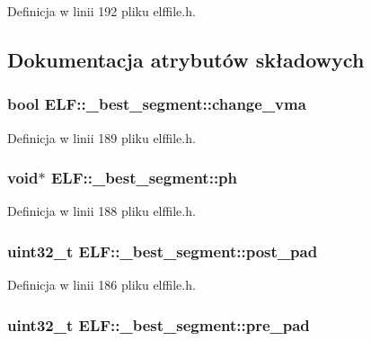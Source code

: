 Definicja w linii 192 pliku elffile.\-h.



\subsection{Dokumentacja atrybutów składowych}
\hypertarget{struct_e_l_f_1_1__best__segment_a47ba70e7bd8a26848b6751b2284d125d}{
\subsubsection[{change\-\_\-vma}]{\setlength{\rightskip}{0pt plus 5cm}bool E\-L\-F\-::\-\_\-best\-\_\-segment\-::change\-\_\-vma}}\label{struct_e_l_f_1_1__best__segment_a47ba70e7bd8a26848b6751b2284d125d}


Definicja w linii 189 pliku elffile.\-h.

\hypertarget{struct_e_l_f_1_1__best__segment_a3ff5e6f835d033c2e6c474f40effcaa5}{
\subsubsection[{ph}]{\setlength{\rightskip}{0pt plus 5cm}void$\ast$ E\-L\-F\-::\-\_\-best\-\_\-segment\-::ph}}\label{struct_e_l_f_1_1__best__segment_a3ff5e6f835d033c2e6c474f40effcaa5}


Definicja w linii 188 pliku elffile.\-h.

\hypertarget{struct_e_l_f_1_1__best__segment_a56521261b757551690172b7bc715dbe5}{
\subsubsection[{post\-\_\-pad}]{\setlength{\rightskip}{0pt plus 5cm}uint32\-\_\-t E\-L\-F\-::\-\_\-best\-\_\-segment\-::post\-\_\-pad}}\label{struct_e_l_f_1_1__best__segment_a56521261b757551690172b7bc715dbe5}


Definicja w linii 186 pliku elffile.\-h.

\hypertarget{struct_e_l_f_1_1__best__segment_a498bc91b02835e614aff97ab1506d29c}{
\subsubsection[{pre\-\_\-pad}]{\setlength{\rightskip}{0pt plus 5cm}uint32\-\_\-t E\-L\-F\-::\-\_\-best\-\_\-segment\-::pre\-\_\-pad}}\label{struct_e_l_f_1_1__best__segment_a498bc91b02835e614aff97ab1506d29c}


